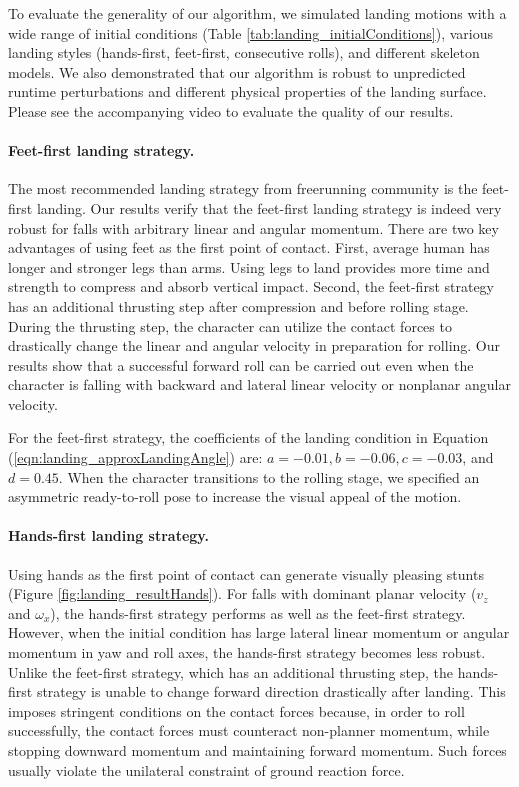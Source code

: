 To evaluate the generality of our algorithm, we simulated landing
motions with a wide range of initial conditions (Table
\ref{tab:landing_initialConditions}), various landing styles (hands-first, feet-first,
consecutive rolls), and different skeleton models. We also demonstrated that
our algorithm is robust to unpredicted runtime perturbations and
different physical properties of the landing surface. Please see the
accompanying video to evaluate the quality of our results.


\paragraph{Feet-first landing strategy.} The most recommended landing
strategy from freerunning community is the feet-first landing. Our
results verify that the feet-first landing strategy is indeed very
robust for falls with arbitrary linear and angular momentum. There are
two key advantages of using feet as the first point of contact. First,
average human has longer and stronger legs than arms. Using legs to
land provides more time and strength to compress and absorb vertical
impact. Second, the feet-first strategy has an additional thrusting
step after compression and before rolling stage. During the thrusting
step, the character can utilize the contact forces to drastically
change the linear and angular velocity in preparation for rolling. Our
results show that a successful forward roll can be carried out even
when the character is falling with backward and lateral linear
velocity or nonplanar angular velocity.

For the feet-first strategy, the coefficients of the landing condition in
Equation (\ref{eqn:landing_approxLandingAngle}) are: $a = -0.01, b = -0.06, c =
-0.03$, and $d = 0.45$. When the character transitions to the rolling
stage, we specified an asymmetric ready-to-roll pose to increase the
visual appeal of the motion.

\paragraph{Hands-first landing strategy.}
Using hands as the first point of contact can generate visually
pleasing stunts (Figure \ref{fig:landing_resultHands}). For falls with
dominant planar velocity ($v_z$ and $\omega_x$), the hands-first
strategy performs as well as the feet-first strategy. However, when
the initial condition has large lateral linear momentum or angular
momentum in yaw and roll axes, the hands-first strategy becomes less
robust. Unlike the feet-first strategy, which has an additional
thrusting step, the hands-first strategy is unable to change forward
direction drastically after landing. This imposes stringent conditions
on the contact forces because, in order to roll successfully, the
contact forces must counteract non-planner momentum, while stopping
downward momentum and maintaining forward momentum. Such forces
usually violate the unilateral constraint of ground reaction force.

